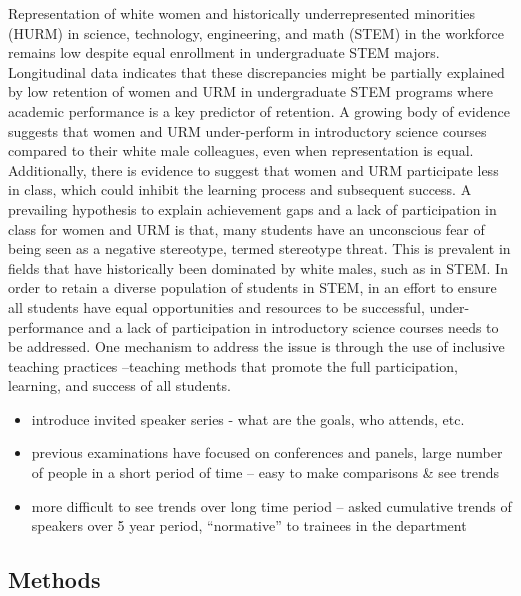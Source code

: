 \documentclass[10pt,]{article}
\begin{document}
Representation of white women and historically underrepresented
minorities (HURM) in science, technology, engineering, and math (STEM)
in the workforce remains low despite equal enrollment in undergraduate
STEM majors. Longitudinal data indicates that these discrepancies might
be partially explained by low retention of women and URM in
undergraduate STEM programs where academic performance is a key
predictor of retention. A growing body of evidence suggests that women
and URM under-perform in introductory science courses compared to their
white male colleagues, even when representation is equal. Additionally,
there is evidence to suggest that women and URM participate less in
class, which could inhibit the learning process and subsequent success.
A prevailing hypothesis to explain achievement gaps and a lack of
participation in class for women and URM is that, many students have an
unconscious fear of being seen as a negative stereotype, termed
stereotype threat. This is prevalent in fields that have historically
been dominated by white males, such as in STEM. In order to retain a
diverse population of students in STEM, in an effort to ensure all
students have equal opportunities and resources to be successful,
under-performance and a lack of participation in introductory science
courses needs to be addressed. One mechanism to address the issue is
through the use of inclusive teaching practices --teaching methods that
promote the full participation, learning, and success of all students.

\begin{itemize}
\item
  introduce invited speaker series - what are the goals, who attends,
  etc.
\item
  previous examinations have focused on conferences and panels, large
  number of people in a short period of time -- easy to make comparisons
  \& see trends
\item
  more difficult to see trends over long time period -- asked cumulative
  trends of speakers over 5 year period, ``normative'' to trainees in
  the department
\end{itemize}

\subsection{Methods}\label{methods}
\end{document}
